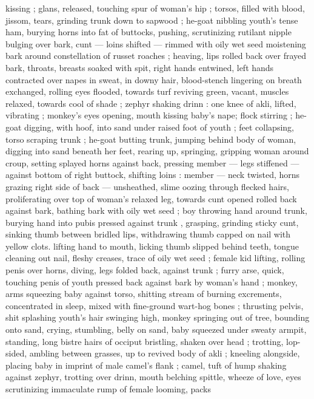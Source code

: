kissing ; glans, released, touching spur of woman's hip ; torsos, filled
with blood, jissom, tears, grinding trunk down to sapwood ; he-goat
nibbling youth's tense ham, burying horns into fat of buttocks,
pushing, scrutinizing rutilant nipple bulging over bark, cunt --- loins
shifted --- rimmed with oily wet seed moistening bark around
constellation of russet roaches ; heaving, lips rolled back over frayed
bark, throats, breasts soaked with spit, right hands entwined, left
hands contracted over napes in sweat, in downy hair, blood-stench
lingering on breath exchanged, rolling eyes flooded, towards turf
reviving green, vacant, muscles relaxed, towards cool of shade ;
zephyr shaking drinn : one knee of akli, lifted, vibrating ; monkey's
eyes opening, mouth kissing baby's nape; flock stirring ; he-goat
digging, with hoof, into sand under raised foot of youth ; feet
collapsing, torso scraping trunk ; he-goat butting trunk, jumping
behind body of woman, digging into sand beneath her feet, rearing
up, springing, gripping woman around croup, setting splayed horns
against back, pressing member --- legs stiffened --- against bottom
of right buttock, shifting loins : member --- neck twisted, horns
grazing right side of back --- unsheathed, slime oozing through
flecked hairs, proliferating over top of woman's relaxed leg, towards
cunt opened rolled back against bark, bathing bark with oily wet seed
; boy throwing hand around trunk, burying hand into pubis pressed
against trunk , grasping, grinding sticky cunt, sinking thumb between
bridled lips, withdrawing thumb capped on nail with yellow clots.
lifting hand to mouth, licking thumb slipped behind teeth, tongue
cleaning out nail, fleshy creases, trace of oily wet seed ; female kid
lifting, rolling penis over horns, diving, legs folded back, against
trunk ; furry arse, quick, touching penis of youth pressed back
against bark by woman's hand ; monkey, arms squeezing baby
against torso, shitting stream of burning excrements, concentrated
in sleep, mixed with fine-ground wart-hog bones ; thrusting pelvis,
shit splashing youth's hair swinging high, monkey springing out of
tree, bounding onto sand, crying, stumbling, belly on sand, baby
squeezed under sweaty armpit, standing, long bistre hairs of occiput
bristling, shaken over head ; trotting, lop-sided, ambling between
grasses, up to revived body of akli ; kneeling alongside, placing baby
in imprint of male camel's flank ; camel, tuft of hump shaking against
zephyr, trotting over drinn, mouth belching spittle, wheeze of love,
eyes scrutinizing immaculate rump of female looming, packs
